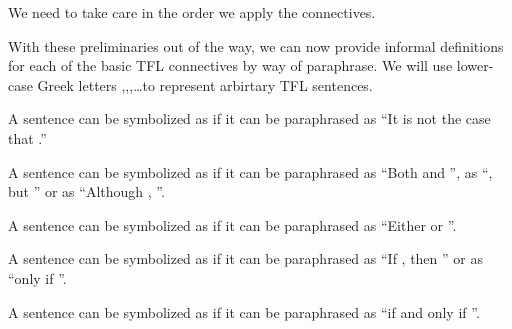
We need to take care in the order we apply the connectives.

With these preliminaries out of the way, we can now provide informal definitions
for each of the basic TFL connectives by way of paraphrase. We will use
lower-case Greek letters \ephi,\epsi,\echi,\dots to represent arbirtary TFL
sentences.

\begin{definition}[Negation]
  A sentence can be symbolized as \enot\ephi if it can be paraphrased as
  ``It is not the case that \ephi.''
\end{definition}

\begin{definition}[Conjunction]
  A sentence can be symbolized as \ephi\eand\epsi if it can be paraphrased as
  ``Both \ephi and \epsi'', as ``\ephi, but \epsi'' or as
  ``Although \ephi, \epsi''.
\end{definition}

\begin{definition}[Disjunction]
  A sentence can be symbolized as \ephi\eor\epsi if it can be paraphrased as
  ``Either \ephi or \epsi''.
\end{definition}

\begin{definition}[Conditional]
  A sentence can be symbolized as \ephi\eif\epsi if it can be
  paraphrased as ``If \ephi, then \epsi'' or as ``\epsi only if \ephi''.
\end{definition}

\begin{definition}[Biconditional]
  A sentence can be symbolized as \ephi\eiff\epsi if it can be
  paraphrased as ``\ephi if and only if \epsi''.
\end{definition}
